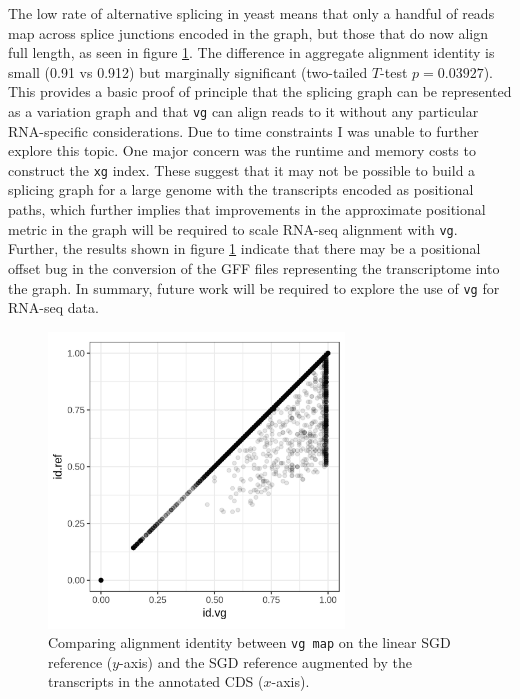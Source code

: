 The low rate of alternative splicing in yeast means that only a handful of reads map across splice junctions encoded in the graph, but those that do now align full length, as seen in figure \ref{fig:yeast_rnaseq}.
The difference in aggregate alignment identity is small (0.91 vs 0.912) but marginally significant (two-tailed $T$-test $p=0.03927$).
This provides a basic proof of principle that the splicing graph can be represented as a variation graph and that {\tt vg} can align reads to it without any particular RNA-specific considerations.
Due to time constraints I was unable to further explore this topic.
One major concern was the runtime and memory costs to construct the {\tt xg} index.
These suggest that it may not be possible to build a splicing graph for a large genome with the transcripts encoded as positional paths, which further implies that improvements in the approximate positional metric in the graph will be required to scale RNA-seq alignment with {\tt vg}.
Further, the results shown in figure \ref{fig:yeast_rnaseq} indicate that there may be a positional offset bug in the conversion of the GFF files representing the transcriptome into the graph.
In summary, future work will be required to explore the use of {\tt vg} for RNA-seq data.

\begin{figure}[htbp!]
  \centering
  \includegraphics[width=0.7\textwidth]{Chapter3/Figs/SRR2069949_100k_ref_vs_gene_model.png}
  \caption[Aligning reads against the yeast transcriptome]{
    Comparing alignment identity between {\tt vg map} on the linear SGD reference ($y$-axis) and the SGD reference augmented by the transcripts in the annotated CDS ($x$-axis).
   }
  \label{fig:yeast_rnaseq}
\end{figure}


